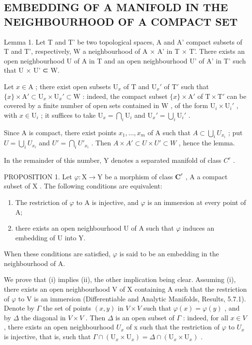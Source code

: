 \subsection{EMBEDDING OF A MANIFOLD IN THE NEIGHBOURHOOD OF A COMPACT SET}

Lemma 1. Let T and T' be two topological spaces, A and A' compact subsets of T and T', respectively, W a neighbourhood of A × A' in T × T'. There exists an open neighbourhood U of A in T and an open neighbourhood U' of A' in T' such that U × U' ⊂ W.

Let \(x \in \mathrm{A}\) ; there exist open subsets \(\mathrm{U}_x\) of \(\mathrm{T}\) and \(\mathrm{U}_x'\) of \(\mathrm{T}'\) such that \(\{x\} \times \mathrm{A}' \subset \mathrm{U}_x \times \mathrm{U}_x' \subset \mathrm{W}\) : indeed, the compact subset \(\{x\} \times \mathrm{A}'\) of \(\mathrm{T} \times \mathrm{T}'\) can be covered by a finite number of open sets contained in \(\mathrm{W}\) , of the form \(\mathrm{U}_i \times \mathrm{U}_i'\) , with \(x \in \mathrm{U}_i\) ; it suffices to take \(\mathrm{U}_x = \bigcap_i \mathrm{U}_i\) and \(\mathrm{U}_x' = \bigcup_i \mathrm{U}_i'\) .

Since A is compact, there exist points \(x_{1},\ldots,x_{m}\) of A such that \(A\subset\bigcup_{i}U_{x_{i}}\) ; put \(U=\bigcup_{i}U_{x_{i}}\) and \(U'=\bigcap_{i}U'_{x_{i}}\) . Then \(A\times A'\subset U\times U'\subset W\) , hence the lemma.

In the remainder of this number, Y denotes a separated manifold of class \(C^{r}\) .

PROPOSITION 1. Let \(\varphi : \mathrm{X} \to \mathrm{Y}\) be a morphism of class \(\mathbf{C}^r\) , A a compact subset of \(\mathrm{X}\) . The following conditions are equivalent:

\begin{enumerate}
\def\labelenumi{(\roman{enumi})}
\item
  The restriction of \(\varphi\) to A is injective, and \(\varphi\) is an immersion at every point of A;
\item
  there exists an open neighbourhood U of A such that \(\varphi\) induces an embedding of U into Y.
\end{enumerate}

When these conditions are satisfied, \(\varphi\) is said to be an embedding in the neighbourhood of A.

We prove that (i) implies (ii), the other implication being clear. Assuming (i), there exists an open neighbourhood V of X containing A such that the restriction of \(\varphi\) to V is an immersion (Differentiable and Analytic Manifolds, Results, 5.7.1). Denote by \(\Gamma\) the set of points \((x,y)\) in \(V \times V\) such that \(\varphi(x) = \varphi(y)\) , and by \(\Delta\) the diagonal in \(V \times V\) . Then \(\Delta\) is an open subset of \(\Gamma\) : indeed, for all \(x \in V\) , there exists an open neighbourhood \(U_x\) of x such that the restriction of \(\varphi\) to \(U_x\) is injective, that is, such that \(\Gamma \cap (\mathrm{U}_x \times \mathrm{U}_x) = \Delta \cap (\mathrm{U}_x \times \mathrm{U}_x)\) .

